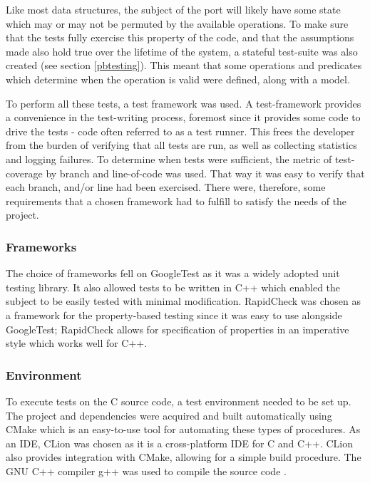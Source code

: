 Like most data structures, the subject of the port will likely have some state which may or may not be permuted by the available operations. To make sure that the tests fully exercise this property of the code, and that the assumptions made also hold true over the lifetime of the system, a stateful test-suite was also created (see section \ref{pbtesting}). This meant that some operations and predicates which determine when the operation is valid were defined, along with a model. 

To perform all these tests, a test framework was used. A test-framework provides a convenience in the test-writing process, foremost since it provides some code to drive the tests - code often referred to as a test runner. This frees the developer from the burden of verifying that all tests are run, as well as collecting statistics and logging failures. To determine when tests were sufficient, the metric of test-coverage by branch and line-of-code was used. That way it was easy to verify that each branch, and/or line had been exercised. There were, therefore, some requirements that a chosen framework had to fulfill to satisfy the needs of the project.

\subsubsection{Frameworks}

The choice of frameworks fell on GoogleTest \cite{GOOGLETEST} as it was a widely adopted unit testing library. It also allowed tests to be written in C++ which enabled the subject to be easily tested with minimal modification. RapidCheck \cite{RAPIDCHECK} was chosen as a framework for the property-based testing since it was easy to use alongside GoogleTest; RapidCheck allows for specification of properties in an imperative style which works well for C++. 


\subsubsection{Environment}\label{environment}

To execute tests on the C source code, a test environment needed to be set up. The project and dependencies were acquired and built automatically using CMake \cite{CMAKE} which is an easy-to-use tool for automating these types of procedures. As an IDE, CLion \cite{CLION} was chosen as it is a cross-platform IDE for C and C++. CLion also provides integration with CMake, allowing for a simple build procedure. The GNU C++ compiler g++ was used to compile the source code \cite{GCC}.

